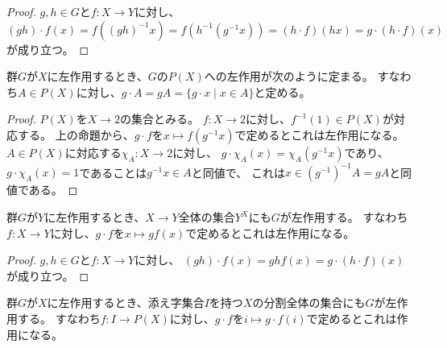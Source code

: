 \begin{proof}
    \leanok
    $g, h\in G$と$f:X\to Y$に対し、
    $(gh)\cdot f(x)=f((gh)^{-1}x)=f(h^{-1}(g^{-1}x))=(h\cdot f)(hx)=g\cdot(h\cdot f)(x)$が成り立つ。
\end{proof}

\begin{proposition}
    \label{powerset-action}
    \leanok
    群$G$が$X$に左作用するとき、$G$の$P(X)$への左作用が次のように定まる。
    すなわち$A\in P(X)$に対し、$g\cdot A=gA=\{g\cdot x\mid x\in A\}$と定める。
\end{proposition}

\begin{proof}
    \leanok
    $P(X)$を$X \to 2$の集合とみる。
    $f:X\to 2$に対し、$f^{-1}(1)\in P(X)$が対応する。
    上の命題から、$g\cdot f$を$x\mapsto f(g^{-1}x)$で定めるとこれは左作用になる。
    $A\in P(X)$に対応する$\chi_A:X\to 2$に対し、
    $g\cdot \chi_A(x)=\chi_A(g^{-1}x)$であり、
    $g\cdot\chi_A(x)=1$であることは$g^{-1}x\in A$と同値で、
    これは$x\in (g^{-1})^{-1}A=gA$と同値である。
\end{proof}

\begin{proposition}
    \label{left-function-left-action2}
    群$G$が$Y$に左作用するとき、$X \to Y$全体の集合$Y^X$にも$G$が左作用する。
    すなわち$f:X\to Y$に対し、$g\cdot f$を$x\mapsto gf(x)$で定めるとこれは左作用になる。
\end{proposition}

\begin{proof}
    $g, h\in G$と$f:X\to Y$に対し、
    $(gh)\cdot f(x)=ghf(x)=g\cdot(h\cdot f)(x)$が成り立つ。
\end{proof}

\begin{proposition}
    \label{decomp-action}
    群$G$が$X$に左作用するとき、添え字集合$I$を持つ$X$の分割全体の集合にも$G$が左作用する。
    すなわち$f:I\to P(X)$に対し、$g\cdot f$を$i\mapsto g\cdot f(i)$で定めるとこれは作用になる。
\end{proposition}


